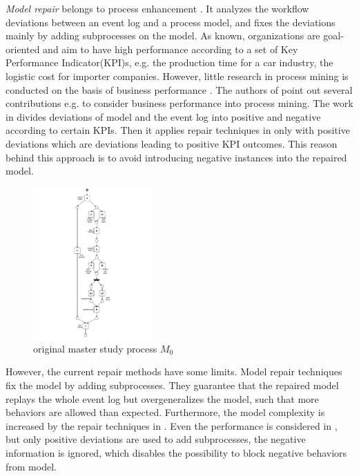 \emph{Model repair} belongs to process enhancement \cite{fahland2012repairing}. It analyzes the workflow deviations between an event log and a process model, and fixes the deviations mainly by adding subprocesses on the model. As known, organizations are goal-oriented and aim to have high performance according to a set of Key Performance Indicator(KPI)s, e.g. the production time for a car industry, the logistic cost for importer companies.  However, little research in process mining is conducted on the basis of business performance \cite{ghasemi2019event}.  The authors of  \cite{ghasemi2019event} point out several contributions e.g.   \cite{dees2017enhancing} to consider business performance into process mining. The work in  \cite{dees2017enhancing} divides deviations of model and the event log into positive and negative according to certain KPIs. Then it applies repair techniques in  \cite{fahland2012repairing} only with positive deviations which are deviations leading to positive KPI outcomes. This reason behind this approach  is to avoid introducing negative instances into the repaired model. 
\begin{figure}
	\centering
	\includegraphics[clip, trim=7cm 0cm 7cm 0cm, width=0.4\textwidth, height=0.7\textheight]{figures/introduction/Master-original-model.pdf}
	\caption{original master study process $M_0$}
	\label{fig:model_M0}
\end{figure} 

However, the current repair methods have some limits. Model repair techniques fix the model by adding subprocesses. They guarantee that the repaired model replays the whole event log but overgeneralizes the model, such that more behaviors are allowed than expected. Furthermore, the model complexity is increased by the repair techniques in \cite{fahland2012repairing}.  Even the performance is considered in  \cite{dees2017enhancing}, but only positive deviations are used to add subprocesses, the negative information is ignored, which disables the possibility to block negative behaviors from model. 


